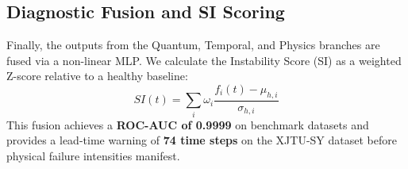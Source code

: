 \subsection{Diagnostic Fusion and SI Scoring}
Finally, the outputs from the Quantum, Temporal, and Physics branches are fused via a non-linear MLP. We calculate the Instability Score (SI) as a weighted Z-score relative to a healthy baseline:
\begin{equation}
    SI(t) = \sum_{i} \omega_i \frac{f_i(t) - \mu_{h,i}}{\sigma_{h,i}}
\end{equation}
This fusion achieves a \textbf{ROC-AUC of 0.9999} on benchmark datasets and provides a lead-time warning of \textbf{74 time steps} on the XJTU-SY dataset before physical failure intensities manifest.
